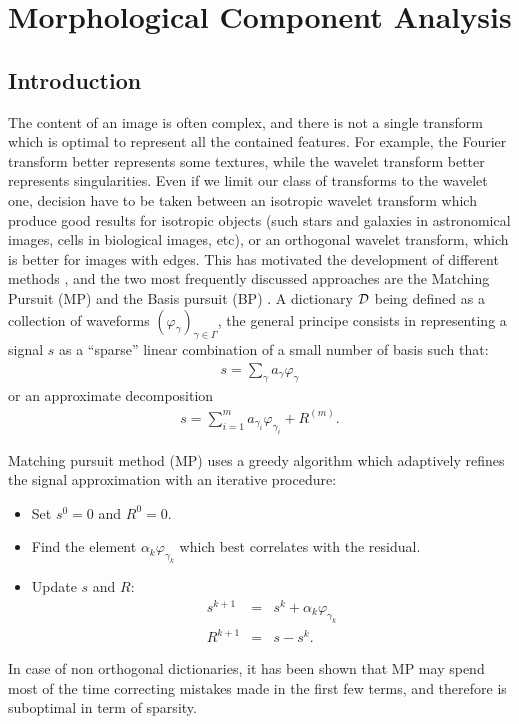 \chapter{Morphological Component Analysis}
\label{sect_ctm}
\section{Introduction}
The content of an image is often complex, and there is not a single
transform which is optimal to represent all the contained features. For
example, the Fourier transform better represents some textures, while
the wavelet transform better represents singularities. Even if we limit
our class of transforms to the wavelet one, decision have to
be taken between an isotropic wavelet transform which produce good 
results for isotropic objects (such stars and galaxies in astronomical 
images, cells in biological images, etc), or an orthogonal wavelet 
transform, which is better for images with edges. 
This has motivated
the development of different methods \cite{wave:donoho98,wave:meyer98,cur:huo99}, 
and the two most frequently discussed approaches are the Matching Pursuit (MP)
\cite{wave:mallat93} and the Basis pursuit (BP) \cite{wave:donoho98}.
A dictionary ${\cal D}$ being defined as a collection of waveforms 
$(\varphi_{\gamma})_{\gamma \in \Gamma}$,
the general principe consists in representing a signal $s$ as a ``sparse''
linear combination  of a small number of basis such that:
\begin{eqnarray}
 s = \sum_{\gamma} a_{\gamma} \varphi_{\gamma}
\end{eqnarray}
or an approximate decomposition
\begin{eqnarray}
 s = \sum_{i=1}^m a_{\gamma_i} \varphi_{\gamma_i} + R^{(m)} .
\end{eqnarray}
 
Matching pursuit \cite{wave:mallat93,ima:mallat98} method (MP) uses a greedy
algorithm which adaptively refines the signal approximation with an
iterative procedure:
\begin{itemize}
\item Set $s^0 = 0$ and $R^0 = 0$.
\item Find the element $\alpha_k \varphi_{\gamma_k}$ which best correlates with the 
residual.
\item Update $s$ and $R$:
\begin{eqnarray}
s^{k+1} & = & s^k + \alpha_k \varphi_{\gamma_k} \nonumber \\
R^{k+1} & = & s -  s^k .
\end{eqnarray}
\end{itemize}
In case of non orthogonal dictionaries, it has been shown \cite{wave:donoho98}
 that MP may
spend most of the time correcting mistakes made in the first few terms,
and therefore is suboptimal in term of sparsity.

